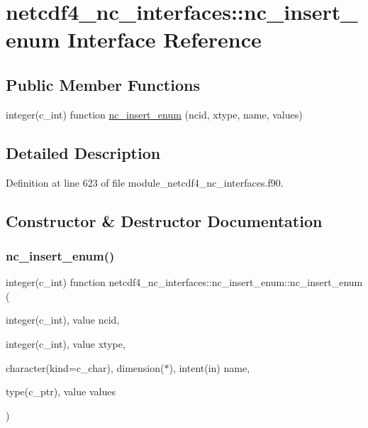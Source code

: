 \hypertarget{interfacenetcdf4__nc__interfaces_1_1nc__insert__enum}{}\section{netcdf4\+\_\+nc\+\_\+interfaces\+:\+:nc\+\_\+insert\+\_\+enum Interface Reference}
\label{interfacenetcdf4__nc__interfaces_1_1nc__insert__enum}
\subsection*{Public Member Functions}
\begin{DoxyCompactItemize}
\item 
integer(c\+\_\+int) function \hyperlink{interfacenetcdf4__nc__interfaces_1_1nc__insert__enum_acf21cb6f7c72e87f9df1b2be77dbaf3b}{nc\+\_\+insert\+\_\+enum} (ncid, xtype, name, values)
\end{DoxyCompactItemize}


\subsection{Detailed Description}


Definition at line 623 of file module\+\_\+netcdf4\+\_\+nc\+\_\+interfaces.\+f90.



\subsection{Constructor \& Destructor Documentation}
\mbox{\label{interfacenetcdf4__nc__interfaces_1_1nc__insert__enum_acf21cb6f7c72e87f9df1b2be77dbaf3b}} 
\subsubsection{\texorpdfstring{nc\+\_\+insert\+\_\+enum()}{nc\_insert\_enum()}}
{\footnotesize\ttfamily integer(c\+\_\+int) function netcdf4\+\_\+nc\+\_\+interfaces\+::nc\+\_\+insert\+\_\+enum\+::nc\+\_\+insert\+\_\+enum (\begin{DoxyParamCaption}\item[{integer(c\+\_\+int), value}]{ncid,  }\item[{integer(c\+\_\+int), value}]{xtype,  }\item[{character(kind=c\+\_\+char), dimension($\ast$), intent(in)}]{name,  }\item[{type(c\+\_\+ptr), value}]{values }\end{DoxyParamCaption})}



